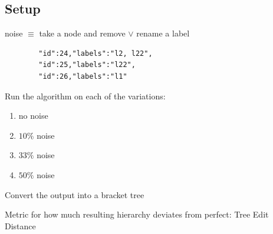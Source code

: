 \documentclass[rgb]{beamer}
\begin{document}
    \subsection{Setup}
        \begin{frame}[fragile]
        \subsectionpage
         noise $\equiv$ take a node and remove $\vee$ rename a label \\

        \begin{lstlisting}
        "id":24,"labels":"l2, l22",
        "id":25,"labels":"l22",
        "id":26,"labels":"l1"
        \end{lstlisting}
         Run the algorithm on each of the variations:
            \begin{enumerate}
                \item no noise
                \item  $10\%$ noise
                \item $33\%$ noise
                \item $50\%$ noise
            \end{enumerate} 
            Convert the output into a bracket tree

                Metric for how much resulting hierarchy deviates from perfect: Tree Edit Distance \cite{pawlik2011rted} \cite{pawlik2016tree}
        \end{frame}
        
\end{document}
